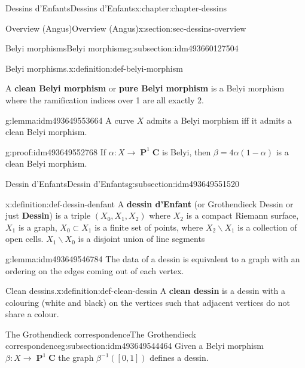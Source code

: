 \documentclass[oneside,10pt,]{book}
\newcommand{\terminology}[1]{\textbf{#1}}
\numberwithin{equation}{section}
\newcommand{\lb}{[}
\newcommand{\rb}{]}
\newcommand{\CC}{\mathbf{C}}
\DeclareMathOperator{\PP}{\mathbf{P}}
\begin{document}
\begin{chapterptx}{Dessins d'Enfants}{}{Dessins d'Enfants}{}{}{x:chapter:chapter-dessins}
\begin{sectionptx}{Overview (Angus)}{}{Overview (Angus)}{}{}{x:section:sec-dessins-overview}
\begin{subsectionptx}{Belyi morphisms}{}{Belyi morphisms}{}{}{g:subsection:idm493660127504}
\begin{definition}{Belyi morphisms.}{x:definition:def-belyi-morphism}
\par
A \terminology{clean Belyi morphism} or \terminology{pure Belyi morphism} is a Belyi morphism where the ramification indices over 1 are all exactly 2.%
\end{definition}
\begin{lemma}{}{}{g:lemma:idm493649553664}%
A curve \(X\) admits a Belyi morphism iff it admits a clean Belyi morphism.%
\end{lemma}
\begin{proofptx}{}{g:proof:idm493649552768}
If \(\alpha \colon X\to \PP^1 \CC\) is Belyi, then \(\beta = 4\alpha(1-\alpha)\) is a clean Belyi morphism.%
\end{proofptx}
\end{subsectionptx}
%
%
\typeout{************************************************}
\typeout{************************************************}
%
\begin{subsectionptx}{Dessin d'Enfants}{}{Dessin d'Enfants}{}{}{g:subsection:idm493649551520}
\begin{definition}{}{x:definition:def-dessin-denfant}%
A \terminology{dessin d'Enfant} (or Grothendieck Dessin or just \terminology{Dessin}) is a triple \((X_0,X_1,X_2)\) where \(X_2\) is a compact Riemann surface, \(X_1\) is a graph, \(X_0 \subset X_1\) is a finite set of points, where \(X_2 \smallsetminus X_1\) is a collection of open cells. \(X_1 \smallsetminus X_0\) is a disjoint union of line segments%
\end{definition}
\begin{lemma}{}{}{g:lemma:idm493649546784}%
The data of a dessin is equivalent to a graph with an ordering on the edges coming out of each vertex.%
\end{lemma}
\begin{definition}{Clean dessins.}{x:definition:def-clean-dessin}%
A \terminology{clean dessin} is a dessin with a colouring (white and black) on the vertices such that adjacent vertices do not share a colour.%
\end{definition}
\end{subsectionptx}
%
%
\typeout{************************************************}
\typeout{************************************************}
%
\begin{subsectionptx}{The Grothendieck correspondence}{}{The Grothendieck correspondence}{}{}{g:subsection:idm493649544464}
Given a Belyi morphism \(\beta\colon X \to \PP^1 \CC\) the graph \(\beta^{-1}(\lb 0,1\rb)\) defines a dessin.%

\end{subsectionptx}
\end{sectionptx}
\end{chapterptx}
\end{document}
